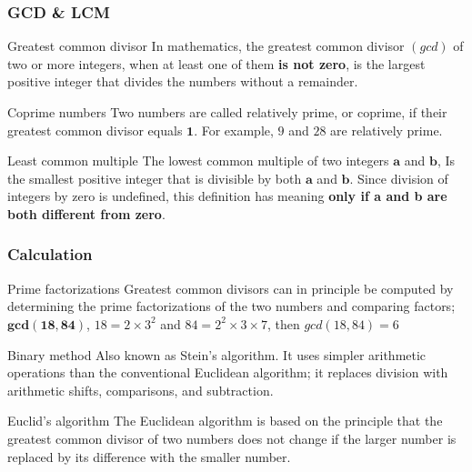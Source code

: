 \documentclass{beamer}
\begin{document}
\begin{frame}
\frametitle{GCD \& LCM}
\begin{block}{Greatest common divisor}
In mathematics, the greatest common divisor $(gcd)$ of two or more integers, when at least one of them \textbf{is not zero}, is the largest positive integer that divides the numbers without a remainder.
\end{block}
\begin{block}{Coprime numbers}
Two numbers are called relatively prime, or coprime, if their greatest common divisor equals $\mathbf{1}$. For example, $9$ and $28$ are relatively prime.
\end{block}
\begin{block}{Least common multiple}
The lowest common multiple of two integers  $\mathbf{a}$ and $\mathbf{b}$, Is the smallest positive integer that is divisible by both $\mathbf{a}$ and $\mathbf{b}$. Since division of integers by zero is undefined, this definition has meaning \textbf{only if a and b are both different from zero}.
\end{block}
\end{frame}

\begin{frame}
\frametitle{Calculation }
  \begin{block}{Prime factorizations}
Greatest common divisors can in principle be computed by determining the prime factorizations of the two numbers and comparing factors;  $\mathbf{gcd(18, 84)}$, $18 = 2 \times 3^2$ and $84 = 2^2 \times 3 \times 7$, then $gcd(18,84) = 6$ 
	\end{block}
  \begin{block}{Binary method}
Also known as Stein's algorithm. It uses  simpler arithmetic operations than the conventional Euclidean algorithm; it replaces division with arithmetic shifts, comparisons, and subtraction.
	\end{block}
  \begin{block}{Euclid's algorithm}
The Euclidean algorithm is based on the principle that the greatest common divisor of two numbers does not change if the larger number is replaced by its difference with the smaller number.
	\end{block}
\end{frame}
\end{document}
